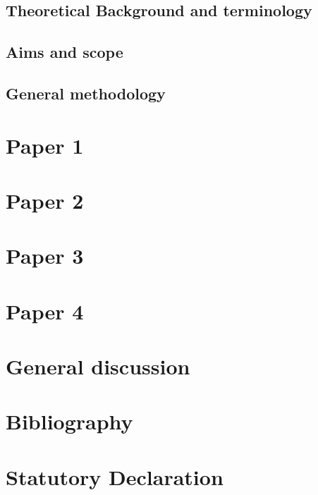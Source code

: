 \documentclass[11pt]{report}
\begin{document}
    \section{Theoretical Background and terminology}
        

    \section{Aims and scope}
    

    \section{General methodology}
    

\chapter{Paper 1}

\chapter{Paper 2}

\chapter{Paper 3}

\chapter{Paper 4}

\chapter{General discussion}

\chapter{Bibliography}



\chapter{Statutory Declaration}
\end{document}
